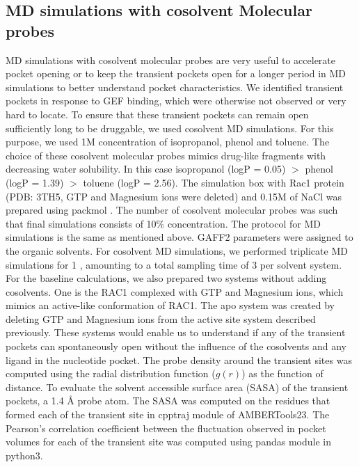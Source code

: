 \documentclass[12pt,a4paper]{achemso}
\begin{document}
\subsection{MD simulations with cosolvent Molecular probes} 
MD simulations with cosolvent molecular probes are very useful to accelerate pocket opening or to keep the transient pockets open for a longer period in MD simulations to better understand pocket characteristics. We identified transient pockets in response to GEF binding, which were otherwise not observed or very hard to locate. To ensure that these transient pockets can remain open sufficiently long to be druggable, we used cosolvent MD simulations. For this purpose, we used 1M concentration of isopropanol, phenol and toluene. The choice of these cosolvent molecular probes mimics drug-like fragments with decreasing water solubility. In this case isopropanol (logP = 0.05) $>$ phenol (logP = 1.39)  $>$ toluene (logP = 2.56). The simulation box with Rac1 protein (PDB: 3TH5, GTP and Magnesium ions were deleted) and 0.15M of NaCl was prepared using packmol \cite{martinez2009packmol}. The number of cosolvent molecular probes was such that final simulations consists of 10\% concentration. The protocol for MD simulations is the same as mentioned above. GAFF2 parameters were assigned to the organic solvents. For cosolvent MD simulations, we performed triplicate MD simulations for 1 ,  amounting to a total sampling time of 3  per solvent system. For the baseline calculations, we also prepared two systems without adding cosolvents.  One is the RAC1 complexed with GTP and Magnesium ions, which mimics an active-like conformation of RAC1. The apo system was created by deleting GTP and Magnesium ions from the active site system described previously. These systems would enable us to understand if any of the transient pockets can spontaneously open without the influence of the cosolvents and any ligand in the nucleotide pocket. The probe density around the transient sites was computed using the radial distribution function ($g(r)$) as the function of distance. To evaluate the solvent accessible surface area (SASA) of the transient pockets, a 1.4 \r{A} probe atom. The SASA was computed on the residues that formed each of the transient site in cpptraj module of AMBERTools23. The Pearson's correlation coefficient between the fluctuation observed in pocket volumes for each of the transient site was computed using pandas module in python3.
\end{document}
